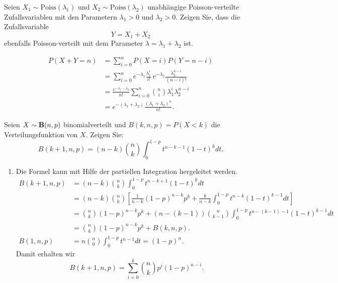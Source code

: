  Seien $X_1\sim
\text{Poiss}(\lambda_1)$ und $X_2\sim \text{Poiss}(\lambda_2)$ unabhängige
Poisson-verteilte Zufallsvariablen mit den Parametern $\lambda_1>0$ und
$\lambda_2>0$. Zeigen Sie, dass die Zufallsvariable
\begin{equation*}
    Y = X_1 + X_2
\end{equation*}
ebenfalls Poisson-verteilt mit dem Parameter $\lambda=\lambda_1 + \lambda_2$ ist. 

\solution 
\begin{align*}
    P\left( X+Y=n \right) &= \sum_{i=0}^{n} P(X=i) P(Y=n-i) \\
    &= \sum_{i=0}^{n} e^{-\lambda_1} \frac{\lambda_{1}^{i}}{i!}\, e^{-\lambda_2} \frac{ \lambda_2^{n-i}}{(n-i)!} \\
    &= \frac{e^{-\lambda_1 -\lambda_2}}{n!} \sum_{i=0}^{n} \binom{n}{i} \lambda_1^{i} \lambda_2^{n-i} \\
    &= e^{- (\lambda_1 + \lambda_2)} \frac{ (\lambda_1 + \lambda_2)^{n}}{n!}.
\end{align*}


 Seien $X\sim\mathbf B(n,p)$ binomialverteilt
und $B(k, n, p) = P( X <k)$ die Verteilungsfunktion von $X$. Zeigen Sie:
\begin{equation*}
    B(k+1, n, p) = (n-k) \binom{n}{k} \int_{0}^{1-p} t^{n-k-1} (1-t)^k dt.
\end{equation*}

\solution
\begin{enumerate}
    \item Die Formel kann mit Hilfe der partiellen Integration hergeleitet werden.
        \begin{align*}
            B(k+1, n, p) &= (n-k) \binom{n}{k} \int_{0}^{1-p} t^{n-k+1} (1-t)^{k} dt \\
            &= (n-k)\binom{n}{k} \left[  \frac{1}{n-k}(1-p)^{n-k} p^{k} + 
            \frac{k}{n-k} \int_{0}^{1-p} t^{n-k} (1-t)^{k-1} dt \right] \\
            &= \binom{n}{k} (1-p)^{n-k} p^{k} + 
            (n-(k-1)) \binom{n}{k-1} \int_{0}^{1-p} t^{n-(k-1)-1} (1-t)^{k-1} dt \\
            &= \binom{n}{k} (1-p)^{n-k} p^{k} + B(k, n, p). \\
            B(1,n,p) &= n \binom{n}{0} \int_{0}^{1-p} t^{n-1} dt = (1-p)^n.
        \end{align*}
        Damit erhalten wir
        \begin{equation*}
            B(k+1, n,p) = \sum_{i=0}^{k} \binom{n}{k} p^{i}(1-p)^{n-i}.
        \end{equation*}
\end{enumerate}

